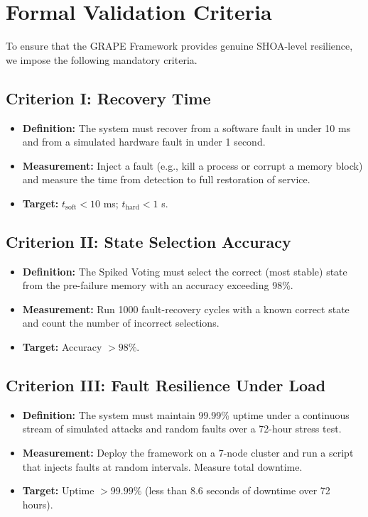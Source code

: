 \documentclass[12pt]{article}
\begin{document}
\section{Formal Validation Criteria}
To ensure that the GRAPE Framework provides genuine SHOA-level resilience, we impose the following mandatory criteria.

\subsection{Criterion I: Recovery Time}
\begin{itemize}
    \item \textbf{Definition:} The system must recover from a software fault in under 10 ms and from a simulated hardware fault in under 1 second.
    \item \textbf{Measurement:} Inject a fault (e.g., kill a process or corrupt a memory block) and measure the time from detection to full restoration of service.
    \item \textbf{Target:} $t_{\text{soft}} < 10$ ms; $t_{\text{hard}} < 1$ s.
\end{itemize}

\subsection{Criterion II: State Selection Accuracy}
\begin{itemize}
    \item \textbf{Definition:} The Spiked Voting must select the correct (most stable) state from the pre-failure memory with an accuracy exceeding 98\%.
    \item \textbf{Measurement:} Run 1000 fault-recovery cycles with a known correct state and count the number of incorrect selections.
    \item \textbf{Target:} Accuracy $> 98\%$.
\end{itemize}

\subsection{Criterion III: Fault Resilience Under Load}
\begin{itemize}
    \item \textbf{Definition:} The system must maintain 99.99\% uptime under a continuous stream of simulated attacks and random faults over a 72-hour stress test.
    \item \textbf{Measurement:} Deploy the framework on a 7-node cluster and run a script that injects faults at random intervals. Measure total downtime.
    \item \textbf{Target:} Uptime $> 99.99\%$ (less than 8.6 seconds of downtime over 72 hours).
\end{itemize}
\end{document}
